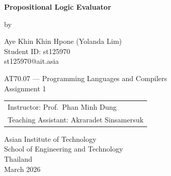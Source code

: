 \setcounter{page}{1}
\thispagestyle{empty}

\vspace*{\fill}

\begin{center}
    {\Large \bfseries Propositional Logic Evaluator}

    \vspace{9em}

    by
    \begin{center}
        Aye Khin Khin Hpone (Yolanda Lim) \\[0.5em]
        {\small Student ID: st125970} \\
        {\small st125970@ait.asia}
    \end{center}

    \vfill

    \begin{center}
        AT70.07 --- Programming Languages and Compilers \\
        Assignment 1
    \end{center}

    \vspace{3em}

    \begin{tabular}{l}
        Instructor: Prof.\ Phan Minh Dung \\
        Teaching Assistant: Akraradet Sinsamersuk
    \end{tabular}

    \vspace{9em}

    Asian Institute of Technology \\
    School of Engineering and Technology \\
    Thailand \\
    March 2026
\end{center}

\vspace*{\fill}
